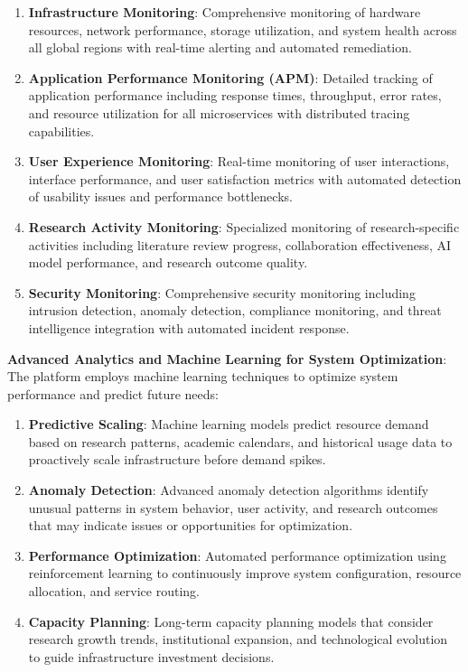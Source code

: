 \documentclass[10pt,twocolumn]{article}
\begin{document}
\begin{enumerate}
    \item \textbf{Infrastructure Monitoring}: Comprehensive monitoring of hardware resources, network performance, storage utilization, and system health across all global regions with real-time alerting and automated remediation.
    
    \item \textbf{Application Performance Monitoring (APM)}: Detailed tracking of application performance including response times, throughput, error rates, and resource utilization for all microservices with distributed tracing capabilities.
    
    \item \textbf{User Experience Monitoring}: Real-time monitoring of user interactions, interface performance, and user satisfaction metrics with automated detection of usability issues and performance bottlenecks.
    
    \item \textbf{Research Activity Monitoring}: Specialized monitoring of research-specific activities including literature review progress, collaboration effectiveness, AI model performance, and research outcome quality.
    
    \item \textbf{Security Monitoring}: Comprehensive security monitoring including intrusion detection, anomaly detection, compliance monitoring, and threat intelligence integration with automated incident response.
\end{enumerate}

\textbf{Advanced Analytics and Machine Learning for System Optimization}: The platform employs machine learning techniques to optimize system performance and predict future needs:

\begin{enumerate}
    \item \textbf{Predictive Scaling}: Machine learning models predict resource demand based on research patterns, academic calendars, and historical usage data to proactively scale infrastructure before demand spikes.
    
    \item \textbf{Anomaly Detection}: Advanced anomaly detection algorithms identify unusual patterns in system behavior, user activity, and research outcomes that may indicate issues or opportunities for optimization.
    
    \item \textbf{Performance Optimization}: Automated performance optimization using reinforcement learning to continuously improve system configuration, resource allocation, and service routing.
    
    \item \textbf{Capacity Planning}: Long-term capacity planning models that consider research growth trends, institutional expansion, and technological evolution to guide infrastructure investment decisions.
\end{enumerate}
\end{document}
